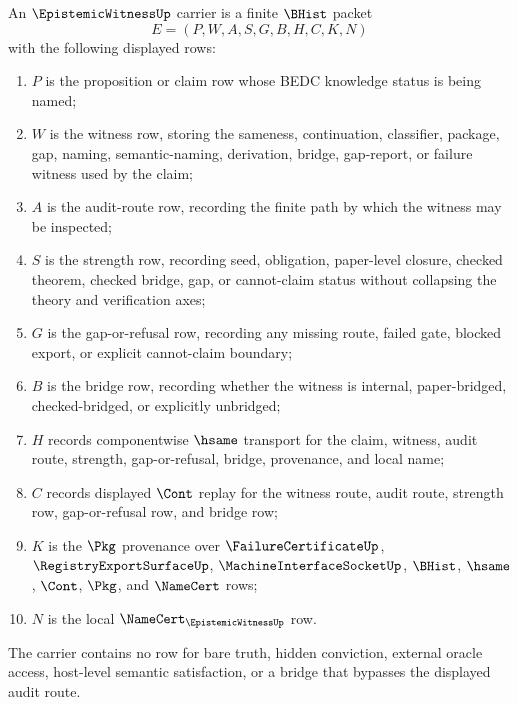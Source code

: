 \begin{definition}
\label{def:epistemic-witness-carrier}
An $\EpistemicWitnessUp$ carrier is a finite $\BHist$ packet
$$
E=(P,W,A,S,G,B,H,C,K,N)
$$
with the following displayed rows:
\begin{enumerate}
\item $P$ is the proposition or claim row whose BEDC knowledge status is being named;
\item $W$ is the witness row, storing the sameness, continuation, classifier, package, gap, naming, semantic-naming, derivation, bridge, gap-report, or failure witness used by the claim;
\item $A$ is the audit-route row, recording the finite path by which the witness may be inspected;
\item $S$ is the strength row, recording seed, obligation, paper-level closure, checked theorem, checked bridge, gap, or cannot-claim status without collapsing the theory and verification axes;
\item $G$ is the gap-or-refusal row, recording any missing route, failed gate, blocked export, or explicit cannot-claim boundary;
\item $B$ is the bridge row, recording whether the witness is internal, paper-bridged, checked-bridged, or explicitly unbridged;
\item $H$ records componentwise $\hsame$ transport for the claim, witness, audit route, strength, gap-or-refusal, bridge, provenance, and local name;
\item $C$ records displayed $\Cont$ replay for the witness route, audit route, strength row, gap-or-refusal row, and bridge row;
\item $K$ is the $\Pkg$ provenance over $\FailureCertificateUp$, $\RegistryExportSurfaceUp$, $\MachineInterfaceSocketUp$, $\BHist$, $\hsame$, $\Cont$, $\Pkg$, and $\NameCert$ rows;
\item $N$ is the local $\NameCert_{\EpistemicWitnessUp}$ row.
\end{enumerate}
The carrier contains no row for bare truth, hidden conviction, external oracle access, host-level semantic satisfaction, or a bridge that bypasses the displayed audit route.
\end{definition}


